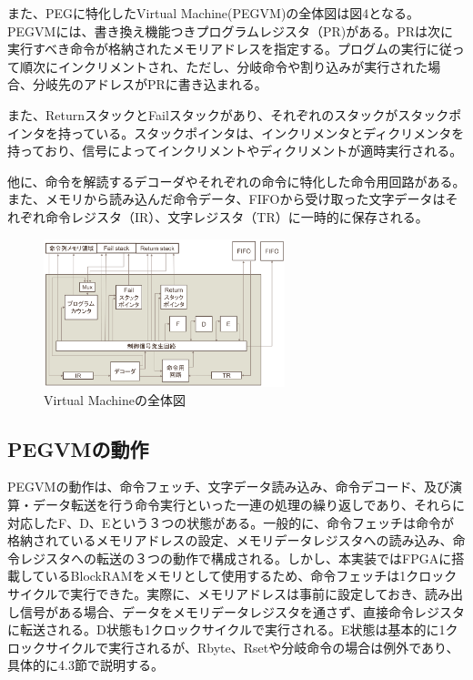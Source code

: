 \documentclass[submit]{ipsj}
\begin{document}
また、PEGに特化したVirtual Machine(PEGVM)の全体図は図4となる。PEGVMには、書き換え機能つきプログラムレジスタ（PR)がある。PRは次に実行すべき命令が格納されたメモリアドレスを指定する。プログムの実行に従って順次にインクリメントされ、ただし、分岐命令や割り込みが実行された場合、分岐先のアドレスがPRに書き込まれる。

また、ReturnスタックとFailスタックがあり、それぞれのスタックがスタックポインタを持っている。スタックポインタは、インクリメンタとディクリメンタを持っており、信号によってインクリメントやディクリメントが適時実行される。

他に、命令を解読するデコーダやそれぞれの命令に特化した命令用回路がある。また、メモリから読み込んだ命令データ、FIFOから受け取った文字データはそれぞれ命令レジスタ（IR）、文字レジスタ（TR）に一時的に保存される。

\begin{figure}[h]
    \begin{center}
        \includegraphics[width=70mm]{./fig/circuit}
       \caption{Virtual Machineの全体図 }
    \end{center}
\end{figure}

\subsection{PEGVMの動作}

PEGVMの動作は、命令フェッチ、文字データ読み込み、命令デコード、及び演算・データ転送を行う命令実行といった一連の処理の繰り返しであり、それらに対応したF、D、Eという３つの状態がある。一般的に、命令フェッチは命令が格納されているメモリアドレスの設定、メモリデータレジスタへの読み込み、命令レジスタへの転送の３つの動作で構成される。しかし、本実装ではFPGAに搭載しているBlockRAMをメモリとして使用するため、命令フェッチは1クロックサイクルで実行できた。実際に、メモリアドレスは事前に設定しておき、読み出し信号がある場合、データをメモリデータレジスタを通さず、直接命令レジスタに転送される。D状態も1クロックサイクルで実行される。E状態は基本的に1クロックサイクルで実行されるが、Rbyte、Rsetや分岐命令の場合は例外であり、具体的に4.3節で説明する。
\end{document}
